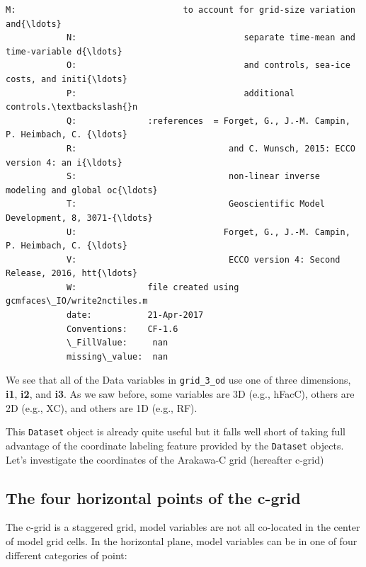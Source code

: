 \documentclass[11pt]{article}
\begin{document}
\begin{Verbatim}[commandchars=\\\{\}]
            M:                                 to account for grid-size variation and{\ldots}
            N:                                 separate time-mean and time-variable d{\ldots}
            O:                                 and controls, sea-ice costs, and initi{\ldots}
            P:                                 additional controls.\textbackslash{}n 
            Q:              :references  = Forget, G., J.-M. Campin, P. Heimbach, C. {\ldots}
            R:                              and C. Wunsch, 2015: ECCO version 4: an i{\ldots}
            S:                              non-linear inverse modeling and global oc{\ldots}
            T:                              Geoscientific Model Development, 8, 3071-{\ldots}
            U:                             Forget, G., J.-M. Campin, P. Heimbach, C. {\ldots}
            V:                              ECCO version 4: Second Release, 2016, htt{\ldots}
            W:              file created using gcmfaces\_IO/write2nctiles.m
            date:           21-Apr-2017
            Conventions:    CF-1.6
            \_FillValue:     nan
            missing\_value:  nan
\end{Verbatim}
            
    We see that all of the Data variables in \texttt{grid\_3\_od} use one of
three dimensions, \textbf{i1}, \textbf{i2}, and \textbf{i3}. As we saw
before, some variables are 3D (e.g., hFacC), others are 2D (e.g., XC),
and others are 1D (e.g., RF).

This \texttt{Dataset} object is already quite useful but it falls well
short of taking full advantage of the coordinate labeling feature
provided by the \texttt{Dataset} objects. Let's investigate the
coordinates of the Arakawa-C grid (hereafter c-grid)

\subsection{The four horizontal points of the
c-grid}\label{the-four-horizontal-points-of-the-c-grid}

The c-grid is a staggered grid, model variables are not all co-located
in the center of model grid cells. In the horizontal plane, model
variables can be in one of four different categories of point:
\end{document}
